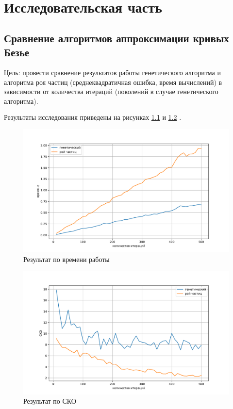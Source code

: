 \documentclass[12pt]{report}
\begin{document}
\chapter{Исследовательская часть}

\section{Сравнение алгоритмов аппроксимации кривых Безье}

Цель: провести сравнение результатов работы генетического алгоритма и алгоритма роя частиц (среднеквадратичная ошибка, время вычислений) в зависимости от количества итераций (поколений в случае генетического алгоритма).

Результаты исследования приведены на рисунках \ref{fig:res_time} и \ref{fig:res_std} .

\begin{figure}[h!]
  \centering
  \includegraphics[width = \linewidth]{result_time.pdf}
  \caption{Результат по времени работы}
  \label{fig:res_time}
\end{figure}
\newpage
\begin{figure}[h!]
  \centering
  \includegraphics[width = \linewidth]{result_std.pdf}
  \caption{Результат по СКО}
  \label{fig:res_std}
\end{figure}
\end{document}
